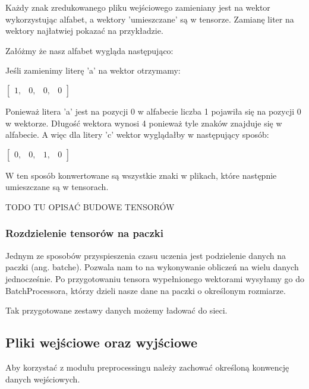 Każdy znak zredukowanego pliku wejściowego zamieniany jest na wektor wykorzystując alfabet, 
a wektory 'umieszczane' są w tensorze. Zamianę liter na wektory najłatwiej pokazać na przykładzie.

Załóżmy że nasz alfabet wygląda następująco:

Jeśli zamienimy literę 'a' na wektor otrzymamy: 
 
\vspace{2mm}
$
\begin{bmatrix} 
1, & 0, & 0, & 0
\end{bmatrix} 
$
\vspace{2mm}

Ponieważ litera 'a' jest na pozycji 0 w alfabecie liczba 1 pojawiła się na pozycji 0 w wektorze.
Długość wektora wynosi 4 ponieważ tyle znaków znajduje się w alfabecie. A więc dla litery 
'c' wektor wyglądałby w następujący sposób:

\vspace{2mm}
$
\begin{bmatrix} 
0, & 0, & 1, & 0
\end{bmatrix} 
$
\vspace{2mm}

W ten sposób konwertowane są wszystkie znaki w plikach, które następnie umieszczane są w tensorach.

TODO
TU OPISAĆ BUDOWE TENSORÓW

\newpage
\subsubsection{Rozdzielenie tensorów na paczki}
Jednym ze sposobów przyspieszenia czasu uczenia jest podzielenie danych na paczki (ang. batche).
Pozwala nam to na wykonywanie obliczeń na wielu danych jednocześnie. Po przygotowaniu tensora wypełnionego wektorami
wysyłamy go do BatchProcessora, którzy dzieli nasze dane na paczki o określonym rozmiarze. 

\vspace{2mm}
Tak przygotowane zestawy danych możemy ładować do sieci.

\subsection{Pliki wejściowe oraz wyjściowe}
Aby korzystać z modułu preprocessingu należy zachować określoną konwencję danych wejściowych. 

